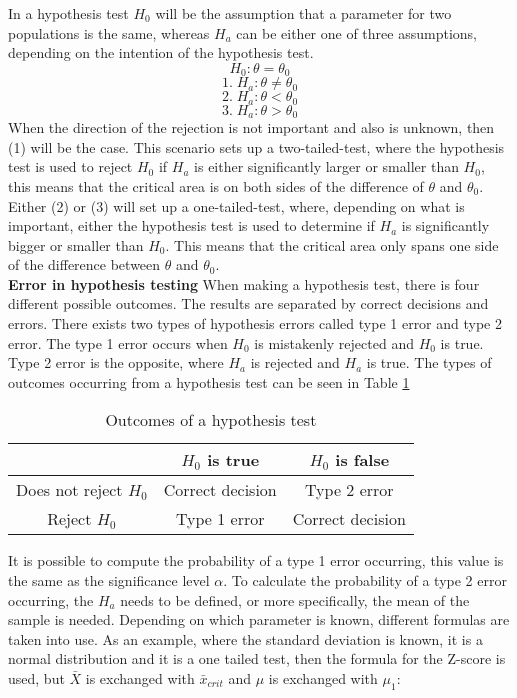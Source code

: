 \noindent In a hypothesis test $H_0$ will be the assumption that a parameter for two populations is the same, whereas $H_a$ can be either one of three assumptions, depending on the intention of the hypothesis test.
$$H_0: \theta = \theta_0$$
$$1.\;H_a: \theta \neq \theta_0$$
$$2.\;H_a: \theta < \theta_0$$
$$3.\;H_a: \theta > \theta_0$$
When the direction of the rejection is not important and also is unknown, then (1) will be the case. This scenario sets up a two-tailed-test, where the hypothesis test is used to reject $H_0$ if $H_a$ is either significantly larger or smaller than $H_0$, this means that the critical area is on both sides of the difference of $\theta$ and $\theta_0$. Either (2) or (3) will set up a one-tailed-test, where, depending on what is important, either the hypothesis test is used to determine if $H_a$ is significantly bigger or smaller than $H_0$. This means that the critical area only spans one side of the difference between $\theta$ and $\theta_0$.\\


\noindent \textbf{Error in hypothesis testing}
\newline
When making a hypothesis test, there is four different possible outcomes. The results are separated by correct decisions and errors. There exists two types of hypothesis errors called type 1 error and type 2 error. The type 1 error occurs when $H_0$ is mistakenly rejected and $H_0$ is true. Type 2 error is the opposite, where $H_a$ is rejected and $H_a$ is true. The types of outcomes occurring from a hypothesis test can be seen in Table \ref{tab:example2x3}
\begin{table}[h!]
	\centering
	\begin{tabular}{|c|c|c|}
		\hline
		 & $H_0$ is true & $H_0$ is false \\
		\hline
		Does not reject $H_0$ & Correct decision & Type 2 error \\ \hline
		Reject $H_0$ & Type 1 error & Correct decision \\
		\hline
	\end{tabular}
	\caption{Outcomes of a hypothesis test}
	\label{tab:example2x3}
\end{table}

\noindent It is possible to compute the probability of a type 1 error occurring, this value is the same as the significance level $\alpha$. To calculate the probability of a type 2 error occurring, the $H_a$ needs to be defined, or more specifically, the mean of the sample is needed. Depending on which parameter is known, different formulas are taken into use. As an example, where the standard deviation is known, it is a normal distribution and it is a one tailed test, then the formula for the Z-score is used, but $\bar{X}$ is exchanged with $\bar{x}_{crit}$ and $\mu$ is exchanged with $\mu_1$:

